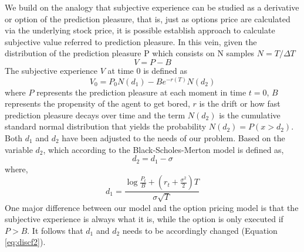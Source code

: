 \documentclass[11pt, onecolumn]{article}
\begin{document}
We build on the analogy that subjective experience can be studied as a derivative or option of the prediction pleasure, that is, just as options price are calculated via the underlying stock price, it is possible establish approach to calculate subjective value referred to prediction pleasure. 
In this vein, given the distribution of the prediction pleasure P which consists on N samples $N = T / \Delta T$
\begin{equation}
V = P - B 
\label{eq:bsmadap1ap}
\end{equation}  
The subjective experience $V$ at time 0 is defined as 
\begin{equation}
V_0 =P_0 N(d_1)  - B e^ {-r(T)}N(d_2)
\label{eq:bsmadap2ap}
\end{equation}
where $P$ represents the prediction pleasure at each moment in time $t=0$, $B$ represents the propensity of the agent to get bored, $r$ is the drift or how fast prediction pleasure decays over time and the term $N(d_2)$ is the cumulative standard normal distribution that yields the probability $N(d_2) = P(x > d_2)$. Both $d_1$ and $d_2$ have been  adjusted to the needs of our problem. 
Based on the variable $d_2$, which according to the Black-Scholes-Merton model is defined as, 
\begin{equation}
 d_2 = d_1 - \sigma
\label{eq:instbsmd22}
\end{equation}
 where, 
 \begin{equation}
 d_1 =  \frac{\log \frac{P_t}{B} + (r_t + \frac{\sigma^2}{2})T} {\sigma \sqrt T}
 \label{eq:bsmd31}
 \end{equation} 
One major difference between our model and the option pricing model is that the subjective experience is always what it is, while the option is only executed if $P>B$. It follows that $d_1$ and $d_2$ needs to be accordingly changed (Equation \ref{eq:discf2}).
\end{document}
